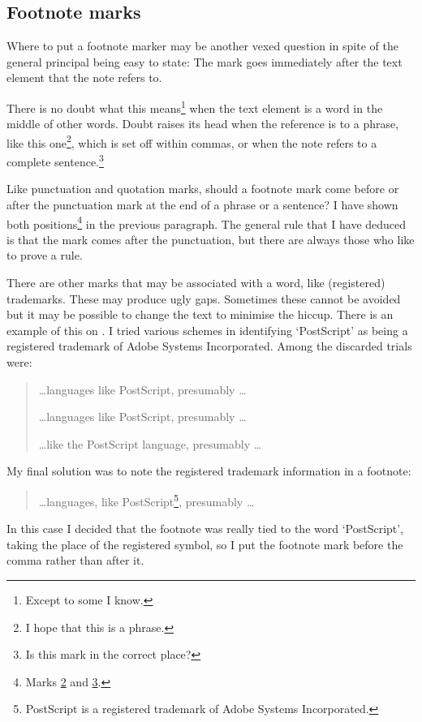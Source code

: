\documentclass[10pt,letterpaper]{memoir}
\begin{document}
\subsection{Footnote marks}

    Where to put a footnote marker may be another vexed question in spite
of the general principal being easy to state: The mark goes immediately
after the text element that the note refers to.

    There is no doubt what this means\footnote{Except to some I know.} when
the text element is a word in the middle of other words. Doubt raises
its head when the reference is to a phrase, like this one\footnote{I hope
that this is a phrase.\label{fn:phrase}}, 
which is set off within commas, or when the note refers to a complete 
sentence.\footnote{Is this mark in the correct place?\label{fn:sentence}}

    Like punctuation and quotation marks, 
should a footnote mark come before
or after the punctuation mark at the end of a phrase or a sentence? I have
shown both positions\footnote{Marks \ref{fn:phrase} and \ref{fn:sentence}.}
 in the previous paragraph. The 
general rule that I have deduced is that the mark comes after the 
punctuation, but there are always those who like to prove a rule.


   There are other marks that may be associated with a word, like 
(registered) trademarks. These may produce ugly gaps. Sometimes these
cannot be avoided but it may be possible to change the text to minimise
the hiccup. There is an example of this on . I tried various
schemes in identifying `PostScript' as being a registered trademark of
Adobe Systems Incorporated. Among the discarded trials were:
\begin{quote}
\ldots languages like PostScript\texttrademark, presumably \ldots

\ldots languages like PostScript\textsuperscript{\textregistered}, presumably \ldots

\ldots like the PostScript\textsuperscript{\textregistered}{} language, presumably \ldots

\end{quote}
My final solution was to note the registered trademark information in
a footnote:
\begin{quote}
\ldots languages, like PostScript\footnote{PostScript is a registered 
trademark of Adobe Systems Incorporated.}, presumably \ldots
\end{quote}
In this case I decided that the footnote was really tied to the word
`PostScript', taking the place of the registered symbol, so I put the
footnote mark before the comma rather than after it.
\end{document}

